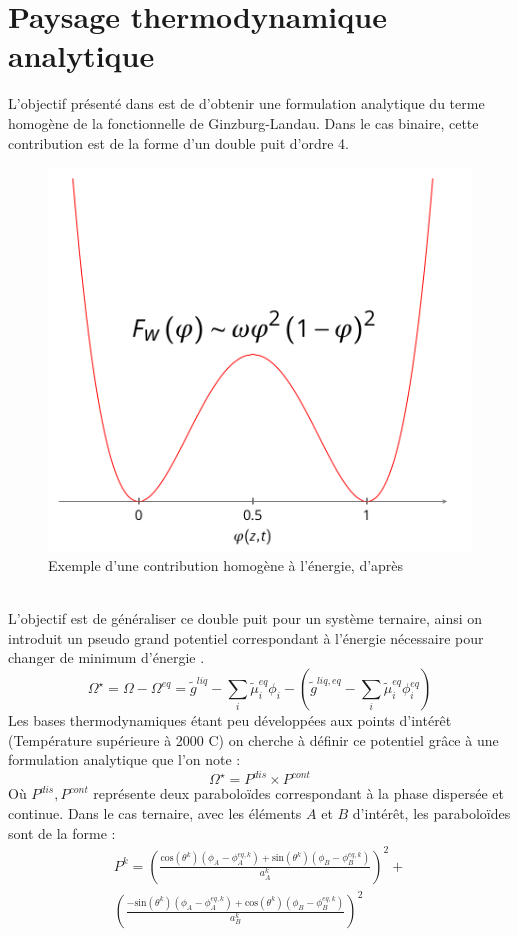 \documentclass[a4paper,11pt,fleqn]{report}    %
\newcommand{\co}[1]{\text{cos}\left(#1\right)}
\newcommand{\sinus}[1]{\text{sin}\left(#1\right)}
\begin{document}
\section{Paysage thermodynamique analytique}
L'objectif présenté dans \cite{noauthor_numerical_nodate} est de d'obtenir une formulation analytique du terme homogène de la fonctionnelle de Ginzburg-Landau. Dans le cas binaire, cette contribution est de la forme d'un double puit d'ordre 4.
\begin{figure}[h!]
	\centering
	\includegraphics[width=0.4\linewidth]{figure/DP}
	\caption[Exemple d'une contribution homogène à l'énergie]{Exemple d'une contribution homogène à l'énergie, d'après \cite{introini_suivi_nodate}}
	\label{fig:dp}
\end{figure}\\
L'objectif est de généraliser ce double puit pour un système ternaire, ainsi on introduit un pseudo grand potentiel correspondant à l'énergie nécessaire pour changer de minimum d'énergie \cite{cardon_modelisation_2016}.
\begin{equation}
\Omega^{\star} =\Omega - \Omega^{eq} =  \tilde{g}^{liq} - \sum_i \tilde{\mu}_i^{eq}\phi_i - \left(  \tilde{g}^{liq,eq} -  \sum_i \tilde{\mu}_i^{eq}\phi_i^{eq} \right) 
\end{equation}
Les bases thermodynamiques étant peu développées aux points d'intérêt (Température supérieure à 2000 \textdegree C) on cherche à définir ce potentiel grâce à une formulation analytique que l'on note :
\begin{equation}\label{double_puit}
	\Omega^{\star}  = P^{dis} \times P^{cont}
\end{equation}
Où $P^{dis}, P^{cont}$ représente deux paraboloïdes correspondant à la phase dispersée et continue. Dans le cas ternaire, avec les éléments $A$ et $B$ d'intérêt, les paraboloïdes sont de la forme : 
\begin{multline}
	P^{k}=\left(\frac{\co{\theta^{k}}(\phi_{A}-\phi_{A}^{eq,k}) + \sinus{\theta^{k}}(\phi_{B}-\phi_{B}^{eq,k})}{a_{A}^{k}}\right)^{2}+\\ \left(\frac{-\sinus{\theta^{k}}(\phi_{A}-\phi_{A}^{eq,k}) + \co{\theta^{k}}(\phi_{B}-\phi_{B}^{eq,k})}{a_{B}^{k}}\right)^{2}
	\label{eq:paraboloid_general_}
\end{multline} 
\end{document}
